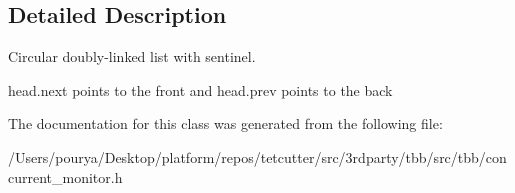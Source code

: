 \subsection{Detailed Description}
Circular doubly-\/linked list with sentinel. 

head.\+next points to the front and head.\+prev points to the back 

The documentation for this class was generated from the following file\+:\begin{DoxyCompactItemize}
\item 
/\+Users/pourya/\+Desktop/platform/repos/tetcutter/src/3rdparty/tbb/src/tbb/concurrent\+\_\+monitor.\+h\end{DoxyCompactItemize}
